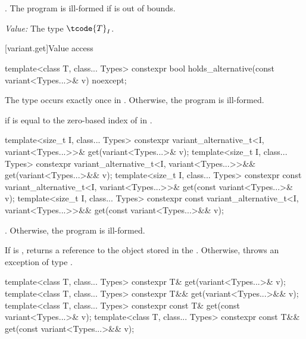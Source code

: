 \begin{itemdescr}
\pnum
\requires {}.
The program is ill-formed if  is out of bounds.

\pnum
\textit{Value:} The type $\tcode{T}_I$.
\end{itemdescr}

[variant.get]{Value access}

\begin{itemdecl}
template<class T, class... Types>
  constexpr bool holds_alternative(const variant<Types...>& v) noexcept;
\end{itemdecl}

\begin{itemdescr}
\pnum
\requires
The type  occurs exactly once in .
Otherwise, the program is ill-formed.

\pnum
\returns
{} if  is equal to the zero-based index of  in .
\end{itemdescr}

%
\begin{itemdecl}
template<size_t I, class... Types>
  constexpr variant_alternative_t<I, variant<Types...>>& get(variant<Types...>& v);
template<size_t I, class... Types>
  constexpr variant_alternative_t<I, variant<Types...>>&& get(variant<Types...>&& v);
template<size_t I, class... Types>
  constexpr const variant_alternative_t<I, variant<Types...>>& get(const variant<Types...>& v);
template<size_t I, class... Types>
  constexpr const variant_alternative_t<I, variant<Types...>>&& get(const variant<Types...>&& v);
\end{itemdecl}

\begin{itemdescr}
\pnum
\requires
{}.
Otherwise, the program is ill-formed.

\pnum
\effects
If  is , returns a reference to the object stored in
the . Otherwise, throws an exception of type .
\end{itemdescr}

%
\begin{itemdecl}
template<class T, class... Types> constexpr T& get(variant<Types...>& v);
template<class T, class... Types> constexpr T&& get(variant<Types...>&& v);
template<class T, class... Types> constexpr const T& get(const variant<Types...>& v);
template<class T, class... Types> constexpr const T&& get(const variant<Types...>&& v);
\end{itemdecl}


